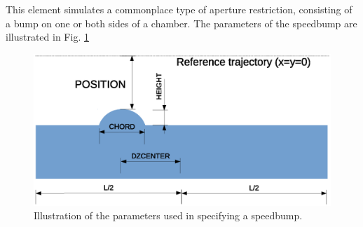 This element simulates a commonplace type of aperture restriction, consisting of a
bump on one or both sides of a chamber. The parameters of the speedbump are
illustrated in Fig. \ref{fig:speedbump}

\begin{figure}[htb]
\center
\includegraphics[width=0.8\linewidth]{speedbump}
\caption{Illustration of the parameters used in specifying a speedbump.}
\label{fig:speedbump}
\end{figure}

\clearpage
